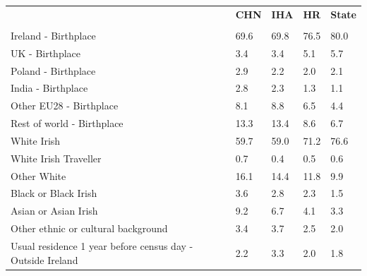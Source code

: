 \documentclass{article}
\begin{document}
\pagebreak
\begin{table}[h]	
\centering
		\begin{tabular}{KTTTT}
  \hline
& \textbf{CHN} & \textbf{IHA} & \textbf{HR}& \textbf{State}\\ 
  \hline
    \\ 
    \hline
Ireland - Birthplace & 69.6& 69.8& 76.5& 80.0\\
UK - Birthplace & 3.4& 3.4& 5.1& 5.7\\
Poland - Birthplace & 2.9& 2.2& 2.0& 2.1\\
India - Birthplace & 2.8& 2.3& 1.3& 1.1\\
Other EU28 - Birthplace & 8.1& 8.8& 6.5& 4.4\\
Rest of world - Birthplace & 13.3& 13.4&  8.6&  6.7\\
    \hline
White Irish & 59.7& 59.0& 71.2& 76.6\\
White Irish Traveller & 0.7& 0.4& 0.5& 0.6\\
Other White & 16.1& 14.4& 11.8&  9.9\\
Black or Black Irish & 3.6& 2.8& 2.3& 1.5\\
Asian or Asian Irish & 9.2& 6.7& 4.1& 3.3\\
Other ethnic or cultural background & 3.4& 3.7& 2.5& 2.0\\
    \hline
Usual residence 1 year before census day - Outside Ireland & 2.2& 3.3& 2.0& 1.8\\


\end{tabular}
\end{table}
\end{document}
